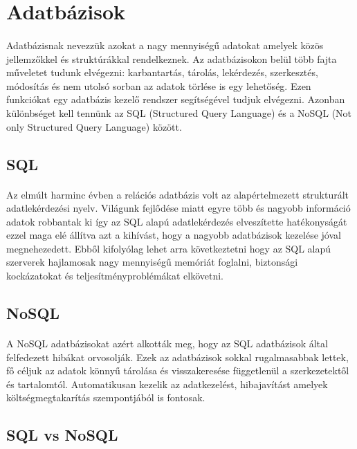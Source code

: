 \section{Adatbázisok}
\paragraph{}
Adatbázisnak nevezzük azokat a nagy mennyiségű adatokat amelyek közös jellemzőkkel és struktúrákkal rendelkeznek. Az adatbázisokon belül több fajta műveletet tudunk elvégezni: karbantartás, tárolás, lekérdezés, szerkesztés, módosítás és nem utolsó sorban az adatok törlése is egy lehetőség. Ezen funkciókat egy adatbázis kezelő rendszer segítségével tudjuk elvégezni.\cite{dbms} Azonban különbséget kell tennünk az SQL (Structured Query Language) és a NoSQL (Not only Structured Query Language) között.
\subsection{SQL}
\paragraph{}
Az elmúlt harminc évben a relációs adatbázis volt az alapértelmezett strukturált adatlekérdezési nyelv. Világunk fejlődése miatt egyre több és nagyobb információ adatok robbantak ki így az SQL alapú adatlekérdezés elveszítette hatékonyságát ezzel maga elé állítva azt a kihívást, hogy a nagyobb adatbázisok kezelése jóval megnehezedett. Ebből kifolyólag lehet arra következtetni hogy az SQL alapú szerverek hajlamosak nagy mennyiségű memóriát foglalni, biztonsági kockázatokat és teljesítményproblémákat elkövetni.\cite{venkatraman2016sql} 
	
\subsection{NoSQL}
\paragraph{}
A NoSQL adatbázisokat azért alkották meg, hogy az SQL adatbázisok által felfedezett hibákat orvosolják. Ezek az adatbázisok sokkal rugalmasabbak lettek, fő céljuk az adatok könnyű tárolása és visszakeresése függetlenül a szerkezetektől és tartalomtól. Automatikusan kezelik az adatkezelést, hibajavítást amelyek költségmegtakarítás szempontjából is fontosak.\cite{venkatraman2016sql} 
	
\subsection{SQL vs NoSQL}
